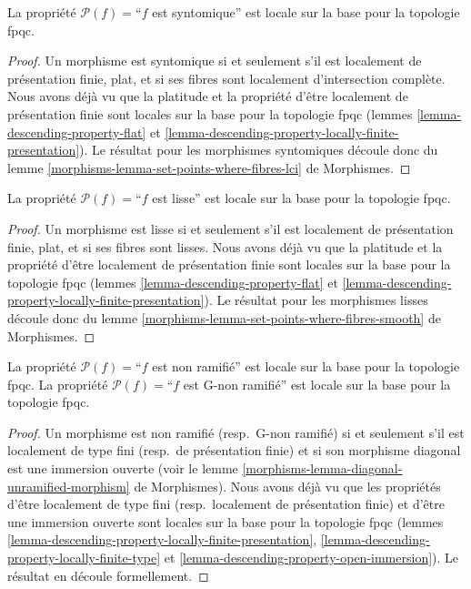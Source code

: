 \begin{lemma}
\label{lemma-descending-property-syntomic}
La propriété $\mathcal{P}(f) =$``$f$ est syntomique''
est locale sur la base pour la topologie fpqc.
\end{lemma}

\begin{proof}
Un morphisme est syntomique si et seulement s'il est localement de présentation
finie, plat, et si ses fibres sont localement d'intersection complète.
Nous avons déjà vu que la platitude et la propriété d'être localement de
présentation finie sont locales sur la base pour la topologie fpqc (lemmes
\ref{lemma-descending-property-flat} et
\ref{lemma-descending-property-locally-finite-presentation}).
Le résultat pour les morphismes syntomiques découle donc du
lemme \ref{morphisms-lemma-set-points-where-fibres-lci} de Morphismes.
\end{proof}

\begin{lemma}
\label{lemma-descending-property-smooth}
La propriété $\mathcal{P}(f) =$``$f$ est lisse''
est locale sur la base pour la topologie fpqc.
\end{lemma}

\begin{proof}
Un morphisme est lisse si et seulement s'il est localement de présentation
finie, plat, et si ses fibres sont lisses. Nous avons déjà vu que la platitude
et la propriété d'être localement de présentation finie sont locales sur la
base pour la topologie fpqc (lemmes
\ref{lemma-descending-property-flat} et
\ref{lemma-descending-property-locally-finite-presentation}).
Le résultat pour les morphismes lisses découle donc du
lemme \ref{morphisms-lemma-set-points-where-fibres-smooth} de Morphismes.
\end{proof}

\begin{lemma}
\label{lemma-descending-property-unramified}
La propriété $\mathcal{P}(f) =$``$f$ est non ramifié''
est locale sur la base pour la topologie fpqc.
La propriété $\mathcal{P}(f) =$``$f$ est G-non ramifié''
est locale sur la base pour la topologie fpqc.
\end{lemma}

\begin{proof}
Un morphisme est non ramifié (resp.\ G-non ramifié) si et seulement s'il est
localement de type fini (resp.\ de présentation finie)
et si son morphisme diagonal est une immersion ouverte (voir
le lemme \ref{morphisms-lemma-diagonal-unramified-morphism} de Morphismes).
Nous avons déjà vu que les propriétés d'être localement de type fini
(resp.\ localement de présentation finie) et d'être une immersion ouverte sont
locales sur la base pour la topologie fpqc (lemmes
\ref{lemma-descending-property-locally-finite-presentation},
\ref{lemma-descending-property-locally-finite-type} et
\ref{lemma-descending-property-open-immersion}).
Le résultat en découle formellement.
\end{proof}

